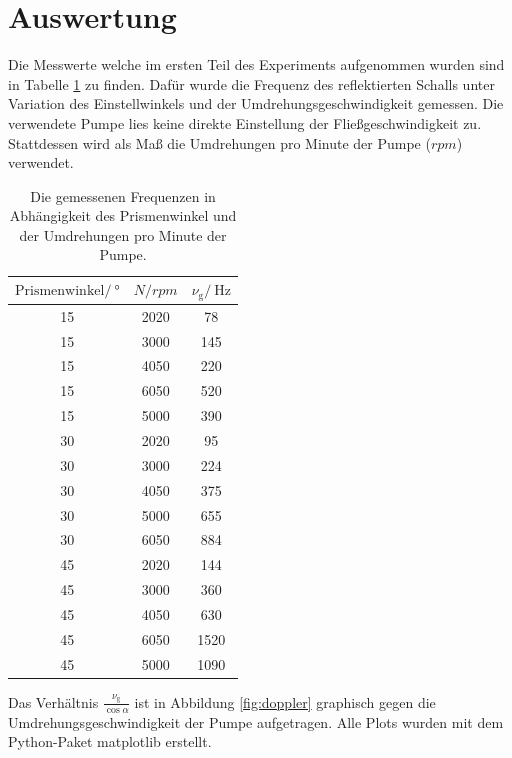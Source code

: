 \section{Auswertung}
\label{sec:Auswertung}

Die Messwerte welche im ersten Teil des Experiments aufgenommen wurden sind in Tabelle \ref{tab:doppler} zu finden.
Dafür wurde die Frequenz des reflektierten Schalls unter Variation des Einstellwinkels und der Umdrehungsgeschwindigkeit gemessen.
Die verwendete Pumpe lies keine direkte Einstellung der Fließgeschwindigkeit zu.
Stattdessen wird als Maß die Umdrehungen pro Minute der Pumpe ($rpm$) verwendet.

\begin{table}
    \centering
    \begin{tabular}{ccc}
    \toprule
    $\text{Prismenwinkel}/\SI{}{\degree}$ & $N/rpm$ &  $\nu_\text{g}/\SI{}{\Hz}$ \\
    \midrule
    15 & 2020 & 78      \\
    15 & 3000 & 145     \\
    15 & 4050 & 220     \\
    15 & 6050 & 520     \\
    15 & 5000 & 390     \\
    30 & 2020 & 95      \\
    30 & 3000 & 224     \\
    30 & 4050 & 375     \\
    30 & 5000 & 655     \\
    30 & 6050 & 884     \\
    45 & 2020 & 144     \\
    45 & 3000 & 360     \\
    45 & 4050 & 630     \\
    45 & 6050 & 1520    \\
    45 & 5000 & 1090    \\
    \bottomrule
    \end{tabular}
    \caption{Die gemessenen Frequenzen in Abhängigkeit des Prismenwinkel und der Umdrehungen pro Minute der Pumpe.}
    \label{tab:doppler}
\end{table}

Das Verhältnis $\frac{\nu_\text{g}}{\cos \alpha}$ ist in Abbildung \ref{fig:doppler} graphisch gegen die Umdrehungsgeschwindigkeit der Pumpe aufgetragen.
Alle Plots wurden mit dem Python-Paket matplotlib \cite{matplotlib} erstellt.

